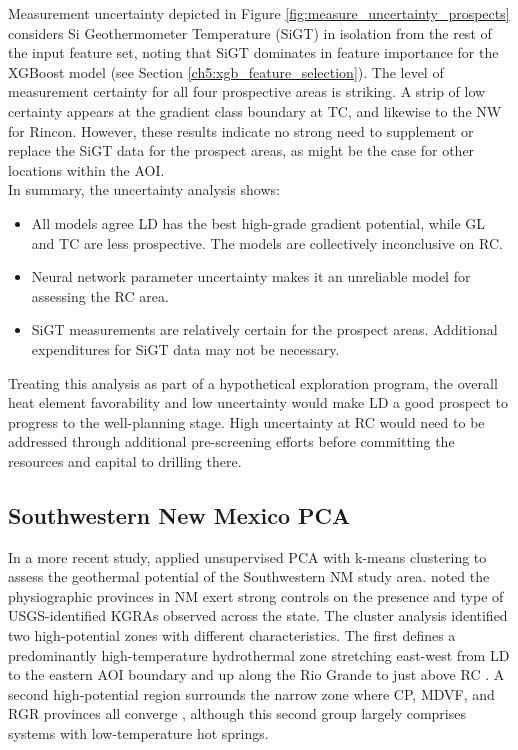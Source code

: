 Measurement uncertainty depicted in Figure \ref{fig:measure_uncertainty_prospects} considers Si Geothermometer Temperature (SiGT) in isolation from the rest of the input feature set, noting that SiGT dominates in feature importance for the XGBoost model (see Section \ref{ch5:xgb_feature_selection}). The level of measurement certainty for all four prospective areas is striking. A strip of low certainty appears at the gradient class boundary at TC, and likewise to the NW for Rincon. However, these results indicate no strong need to supplement or replace the SiGT data for the prospect areas, as might be the case for other locations within the AOI.
\\
In summary, the uncertainty analysis shows:
\begin{itemize}[itemsep=2pt]
    \item All models agree LD has the best high-grade gradient potential, while GL and TC are less prospective. The models are collectively inconclusive on RC.
    \item Neural network parameter uncertainty makes it an unreliable model for assessing the RC area.
    \item SiGT measurements are relatively certain for the prospect areas. Additional expenditures for SiGT data may not be necessary.
\end{itemize}
Treating this analysis as part of a hypothetical exploration program, the overall heat element favorability and low uncertainty would make LD a good prospect to progress to the well-planning stage. High uncertainty at RC would need to be addressed through additional pre-screening efforts before committing the resources and capital to drilling there.

\subsection{Southwestern New Mexico PCA}\label{ch5:case_nm_pca}
In a more recent study, \citet{pepin_new_2019} applied unsupervised PCA with k-means clustering to assess the geothermal potential of the Southwestern NM study area. \citeauthor{pepin_new_2019} noted the physiographic provinces in NM exert strong controls on the presence and type of USGS-identified KGRAs observed across the state. The cluster analysis identified two high-potential zones with different characteristics. The first defines a predominantly high-temperature hydrothermal zone stretching east-west from LD to the eastern AOI boundary and up along the Rio Grande to just above RC \citep[Figure 3.5A]{pepin_new_2019}. A second high-potential region surrounds the narrow zone where CP, MDVF, and RGR provinces all converge \citep[Figure 3.5C]{pepin_new_2019}, although this second group largely comprises systems with low-temperature hot springs. 


